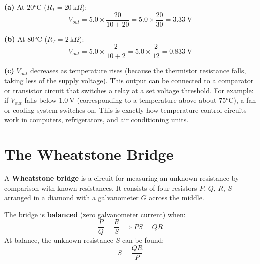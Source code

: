 \begin{solutionbox}
\textbf{(a)} At $20°\text{C}$ ($R_T = 20\ \text{k}\Omega$):
\[
  V_{out} = 5.0 \times \frac{20}{10+20}
  = 5.0 \times \frac{20}{30} = 3.33\ \text{V}
\]

\textbf{(b)} At $80°\text{C}$ ($R_T = 2\ \text{k}\Omega$):
\[
  V_{out} = 5.0 \times \frac{2}{10+2}
  = 5.0 \times \frac{2}{12} = 0.833\ \text{V}
\]

\textbf{(c)} $V_{out}$ decreases as temperature
rises (because the thermistor resistance falls,
taking less of the supply voltage). This output
can be connected to a comparator or transistor
circuit that switches a relay at a set voltage
threshold. For example: if $V_{out}$ falls below
$1.0\ \text{V}$ (corresponding to a temperature
above about $75°\text{C}$), a fan or cooling
system switches on. This is exactly how temperature
control circuits work in computers, refrigerators,
and air conditioning units.
\end{solutionbox}

\section{The Wheatstone Bridge}

\begin{definitionbox}
A \textbf{Wheatstone bridge} is a circuit for
measuring an unknown resistance by comparison with
known resistances. It consists of four resistors
$P$, $Q$, $R$, $S$ arranged in a diamond with a
galvanometer $G$ across the middle.

The bridge is \textbf{balanced} (zero galvanometer
current) when:
\[
  \frac{P}{Q} = \frac{R}{S}
  \implies PS = QR
\]
At balance, the unknown resistance $S$ can be found:
\[
  S = \frac{QR}{P}
\]
\end{definitionbox}

